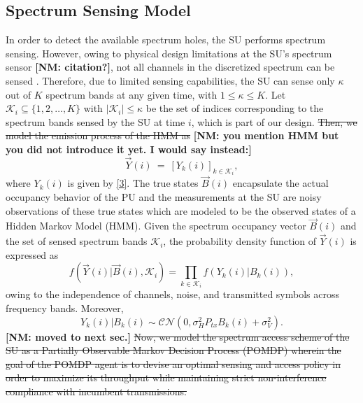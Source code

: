 \documentclass[10pt,twocolumn]{IEEEtran}
\newcommand{\sst}[1]{\st{#1}}
\newcommand{\nm}[1]{{\color{blue}\bf{[NM: #1]}}}
\newcommand{\add}[1]{{\color{red}{#1}}}
\begin{document}
\subsection{Spectrum Sensing Model}
In order to detect the available spectrum holes, the SU performs spectrum sensing. However, owing to physical design limitations at the SU's spectrum sensor \nm{citation?}, not all channels in the discretized spectrum can be sensed \add{at once}. Therefore, due to limited sensing capabilities, the SU can sense only $\kappa$ out of $K$ spectrum bands at any given time, with $1\leq \kappa\leq K$. Let $\mathcal K_{i}\subseteq\{1,2,\dots,K\}$ with $|\mathcal K_i|\leq \kappa$ be the set of indices corresponding to the spectrum bands sensed by the SU at time $i$, which is part of our design.\sst{ Then, we model the emission process of the HMM as }
\nm{you mention HMM but you did not introduce it yet. I would say instead:}
\add{Then, we define the observation vector}
\begin{equation}\label{8}
    \vec{Y}(i)\ =\ [Y_k(i)]_{k\in\mathcal K_i},
\end{equation}
where $Y_k(i)$ is given by \eqref{3}.
The true states $\vec{B}(i)$ encapsulate the actual occupancy behavior of the PU and the measurements at the SU are noisy observations of these true states which are modeled to be the observed states of a Hidden Markov Model (HMM). Given the spectrum occupancy vector $\vec{B}(i)$ and the set of sensed spectrum bands $\mathcal K_i$, the probability density function of $\vec{Y}(i)$ is expressed as
\begin{equation}\label{9}
    f(\vec{Y}(i)|\vec{B}(i),\mathcal K_i)=\prod_{k\in\mathcal K_i}f(Y_k(i)|B_k(i)),
\end{equation}
owing to the independence of channels, noise, and transmitted symbols across frequency bands. Moreover, \add{from \eqref{3} we find that}
\begin{equation}\label{10}
 Y_k(i)|B_k(i)\sim \mathcal{CN}(0,\sigma_H^2P_{tx}B_k(i)+\sigma_V^2).
\end{equation}
\nm{moved to next sec.}
\sst{Now, we model the spectrum access scheme of the SU as a Partially Observable Markov Decision Process (POMDP) wherein the goal of the POMDP agent is to devise an optimal sensing and access policy in order to maximize its throughput while maintaining strict non-interference compliance with incumbent transmissions.}
\end{document}
